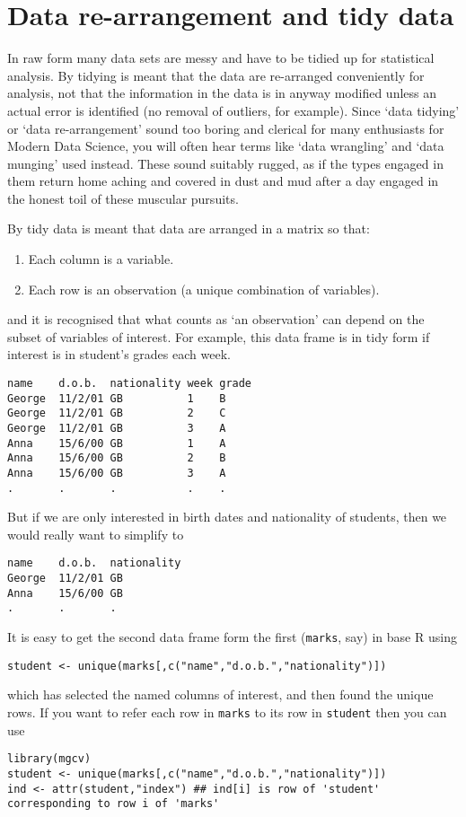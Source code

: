 \documentclass[10pt] {article}
\theoremstyle{definition}
\begin{document}
\section{Data re-arrangement and tidy data}

In raw form many data sets are messy and have to be tidied up for statistical analysis. By tidying is meant that the data are re-arranged conveniently for analysis, not that the information in the data is in anyway modified unless an actual error is identified (no removal of outliers, for example). Since `data tidying' or `data re-arrangement' sound too boring and clerical for many enthusiasts for Modern Data Science, you will often hear terms like `data wrangling' and `data munging' used instead. These sound suitably rugged, as if the types engaged in them return home aching and covered in dust and mud after a day engaged in the honest toil of these muscular pursuits.

By tidy data is meant that data are arranged in a matrix so that:
\begin{enumerate}
\item Each column is a variable.
\item Each row is an observation (a unique combination of variables).
\end{enumerate}
and it is recognised that what counts as `an observation' can depend on the subset of variables of interest. For example,
this data frame is in tidy form if interest is in student's grades each week. 
\begin{verbatim}
name    d.o.b.  nationality week grade
George  11/2/01 GB          1    B
George  11/2/01 GB          2    C
George  11/2/01 GB          3    A
Anna    15/6/00 GB          1    A
Anna    15/6/00 GB          2    B
Anna    15/6/00 GB          3    A
.       .       .           .    .
\end{verbatim}
But if we are only interested in birth dates and nationality of students, then we would really want to simplify to
\begin{verbatim}
name    d.o.b.  nationality 
George  11/2/01 GB          
Anna    15/6/00 GB          
.       .       .           
\end{verbatim}
It is easy to get the second data frame form the first (\verb+marks+, say) in base R using
\begin{verbatim}
student <- unique(marks[,c("name","d.o.b.","nationality")])
\end{verbatim}
which has selected the named columns of interest, and then found the unique rows. If you want to refer each row in \verb+marks+ to its row in \verb+student+ then you can use 
\begin{verbatim}
library(mgcv)
student <- unique(marks[,c("name","d.o.b.","nationality")])
ind <- attr(student,"index") ## ind[i] is row of 'student' corresponding to row i of 'marks'
\end{verbatim}
\end{document}
